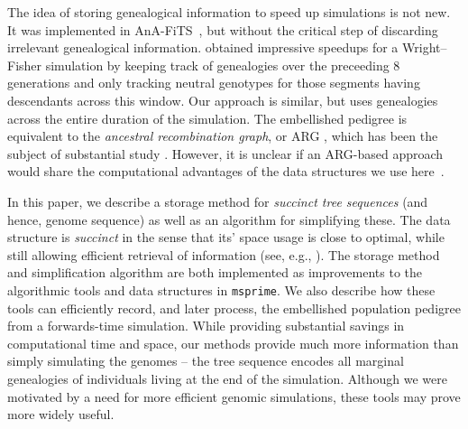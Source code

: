 \documentclass{article}
\newcommand{\msprime}{\texttt{msprime}}
\begin{document}
The idea of storing genealogical information to speed up simulations is not new.
It was implemented in AnA-FiTS~\citep{aberer2013rapid},
but without the critical step of discarding irrelevant genealogical information.
\citet{padhukasahasram2008exploring} obtained impressive speedups for a Wright--Fisher simulation
by keeping track of genealogies over the preceeding 8 generations
and only tracking neutral genotypes for those segments having descendants across this window.
Our approach is similar, but uses genealogies across the entire duration of the simulation.
The embellished pedigree is equivalent to the \emph{ancestral recombination graph},
or {ARG} \citep{griffiths1991two,griffiths1997ancestral},
which has been the subject of substantial study
\citep{wiuf1997number,wiuf1999ancestry,marjoram2006coalescent,wilton2015smc}.
However, it is unclear if an ARG-based approach would share
the computational advantages of the data structures we use here~\citep{kelleher2016efficient}.


In this paper, we describe a storage method for \emph{succinct tree sequences}
(and hence, genome sequence) as well as an algorithm for simplifying these.
The data structure is \emph{succinct} in the sense that its' space usage is close to optimal,
while still allowing efficient retrieval of information (see, e.g.,
\citet{gog2014theory}).
The storage method and simplification algorithm are both implemented
as improvements to the algorithmic tools and data structures in \msprime{}.
We also describe how these tools can efficiently record,
and later process, the embellished population pedigree from a forwards-time simulation.
While providing substantial savings in computational time and space, our methods provide much
more information than simply simulating the genomes -- the tree sequence
encodes all marginal genealogies of individuals living at the end of the simulation.
Although we were motivated by a need for more efficient genomic simulations,
these tools may prove more widely useful.
\end{document}

